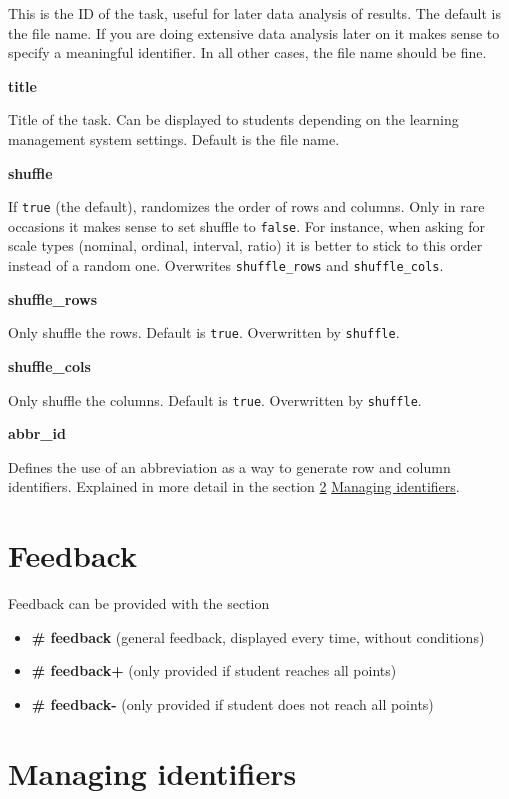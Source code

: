 \documentclass[twoside]{tufte-book}
\providecommand{\tightlist}{%
  \setlength{\itemsep}{0pt}\setlength{\parskip}{0pt}}
\begin{document}
This is the ID of the task, useful for later data analysis of results. The default is the file name. If you are doing extensive data analysis later on it makes sense to specify a meaningful identifier. In all other cases, the file name should be
fine.

\noindent\textbf{title}\label{title-7}

Title of the task. Can be displayed to students depending on the learning management system settings. Default is the file name.

\noindent\textbf{shuffle}\label{shuffle-4}

If \texttt{true} (the default), randomizes the order of rows and columns. Only in rare occasions it makes sense to set shuffle to \texttt{false}. For instance, when asking for scale types (nominal, ordinal, interval, ratio) it is better to stick to this order instead of a random one. Overwrites \texttt{shuffle\_rows} and \texttt{shuffle\_cols}.

\noindent\textbf{shuffle\_rows}\label{shuffle_rows}

Only shuffle the rows. Default is \texttt{true}. Overwritten by \texttt{shuffle}.

\noindent\textbf{shuffle\_cols}\label{shuffle_cols}

Only shuffle the columns. Default is \texttt{true}. Overwritten by \texttt{shuffle}.

\noindent\textbf{abbr\_id}\label{abbr_id-1}

Defines the use of an abbreviation as a way to generate row and column identifiers. Explained in more detail in the section \ref{ids} \hyperref[ids]{Managing identifiers}.

\section{Feedback}\label{feedback-7}

Feedback can be provided with the section

\begin{itemize}
\tightlist
\item
  \textbf{\# feedback} (general feedback, displayed every time, without conditions)
\item
  \textbf{\# feedback+} (only provided if student reaches all points)
\item
  \textbf{\# feedback-} (only provided if student does not reach all points)
\end{itemize}

\section{Managing identifiers}\label{ids}
\end{document}

